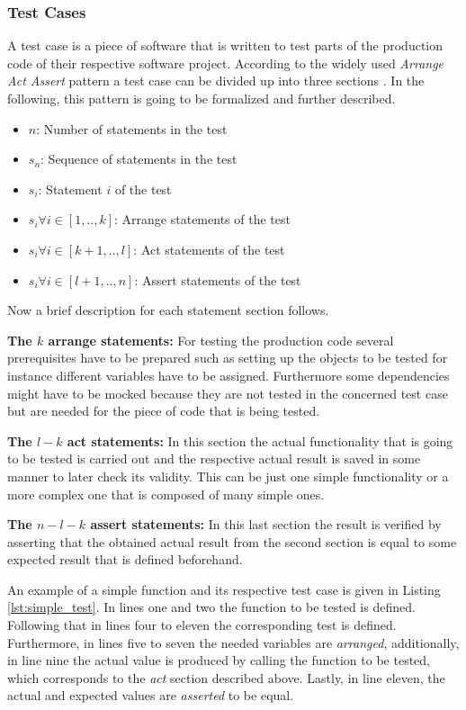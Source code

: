 \documentclass[
fancyheadings, %
%
%
]{stsreprt}
\begin{document}
\subsubsection{Test Cases}
A test case is a piece of software that is written to test parts of the production code of their respective software project. According to the widely used \textit{Arrange Act Assert} pattern a test case can be divided up into three sections \cite{darbord:2023}. In the following, this pattern is going to be formalized and further described. \par
\begin{itemize}
    \item $n$: Number of statements in the test
    \item $s_n$: Sequence of statements in the test
    \item $s_i$: Statement $i$ of the test
    \item $s_i \forall i \in [1, .., k]$: Arrange statements of the test
    \item $s_i \forall i \in [k+1, .., l]$: Act statements of the test
    \item $s_i \forall i \in [l+1, .., n]$: Assert statements of the test
\end{itemize} 
Now a brief description for each statement section follows. \par
\textbf{The $k$ arrange statements:} For testing the production code several prerequisites have to be prepared such as setting up the objects to be tested for instance different variables have to be assigned. Furthermore 
some dependencies might have to be mocked because they are not tested in the concerned test case but are needed for the piece of code that is being tested. \par
\textbf{The $l-k$ act statements:} In this section the actual functionality that is going to be tested is carried out and the respective actual result is saved in some manner to later check its validity. This can be just one simple functionality or a more complex one that is composed of many simple ones. \par
\textbf{The $n-l-k$ assert statements:} In this last section the result is verified by asserting that the obtained actual result from the second section is equal to some expected result that is defined beforehand. \par
An example of a simple function and its respective test case is given in Listing \ref{lst:simple_test}. 
In lines one and two the function to be tested is defined. 
Following that in lines four to eleven the corresponding test is defined.
Furthermore, in lines five to seven the needed variables are \textit{arranged}, additionally, in line nine the actual value is produced by calling the function to be tested, which corresponds to the \textit{act} section described above. 
Lastly, in line eleven, the actual and expected values are \textit{asserted} to be equal. 
\end{document}
